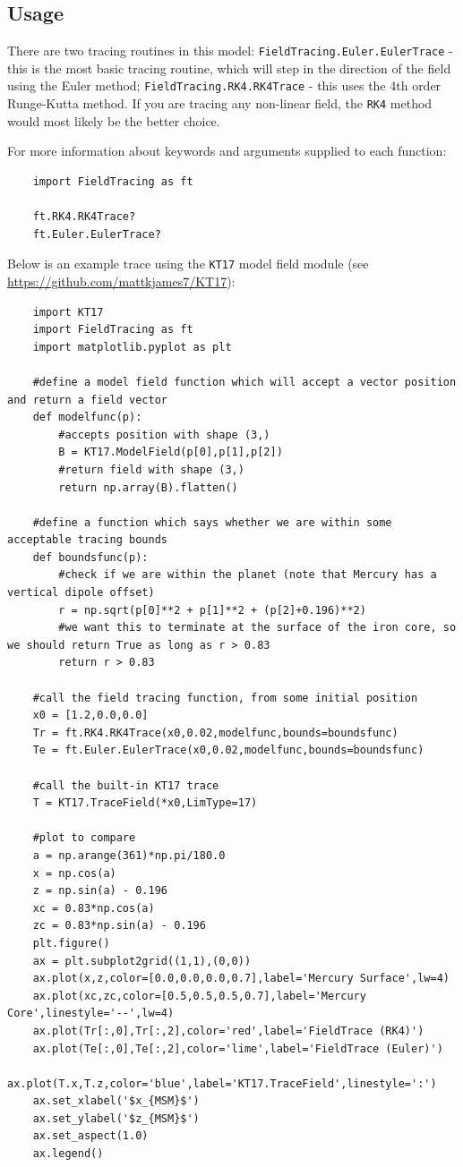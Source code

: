 	\subsection{Usage}
	
	There are two tracing routines in this model: \texttt{FieldTracing.Euler.EulerTrace} - this is the most basic tracing routine, which will step in the direction of the field using the Euler method; \texttt{FieldTracing.RK4.RK4Trace} - this uses the 4th order Runge-Kutta method. If you are tracing any non-linear field, the \texttt{RK4} method would most likely be the better choice.
	
	For more information about keywords and arguments supplied to each function:
	
	\begin{verbatim}
	import FieldTracing as ft
	
	ft.RK4.RK4Trace?
	ft.Euler.EulerTrace?
	\end{verbatim}
	
	Below is an example trace using the \texttt{KT17} model field module (see \url{https://github.com/mattkjames7/KT17}):
	
	\begin{verbatim}
	import KT17
	import FieldTracing as ft
	import matplotlib.pyplot as plt
	
	#define a model field function which will accept a vector position and return a field vector
	def modelfunc(p):
		#accepts position with shape (3,)
		B = KT17.ModelField(p[0],p[1],p[2])
		#return field with shape (3,)
		return np.array(B).flatten()
	
	#define a function which says whether we are within some acceptable tracing bounds
	def boundsfunc(p):
		#check if we are within the planet (note that Mercury has a vertical dipole offset)
		r = np.sqrt(p[0]**2 + p[1]**2 + (p[2]+0.196)**2)
		#we want this to terminate at the surface of the iron core, so we should return True as long as r > 0.83
		return r > 0.83
	
	#call the field tracing function, from some initial position
	x0 = [1.2,0.0,0.0]
	Tr = ft.RK4.RK4Trace(x0,0.02,modelfunc,bounds=boundsfunc)
	Te = ft.Euler.EulerTrace(x0,0.02,modelfunc,bounds=boundsfunc)
	
	#call the built-in KT17 trace
	T = KT17.TraceField(*x0,LimType=17)
	
	#plot to compare
	a = np.arange(361)*np.pi/180.0
	x = np.cos(a)
	z = np.sin(a) - 0.196
	xc = 0.83*np.cos(a)
	zc = 0.83*np.sin(a) - 0.196
	plt.figure()
	ax = plt.subplot2grid((1,1),(0,0))
	ax.plot(x,z,color=[0.0,0.0,0.0,0.7],label='Mercury Surface',lw=4)
	ax.plot(xc,zc,color=[0.5,0.5,0.5,0.7],label='Mercury Core',linestyle='--',lw=4)
	ax.plot(Tr[:,0],Tr[:,2],color='red',label='FieldTrace (RK4)')
	ax.plot(Te[:,0],Te[:,2],color='lime',label='FieldTrace (Euler)')
	ax.plot(T.x,T.z,color='blue',label='KT17.TraceField',linestyle=':')
	ax.set_xlabel('$x_{MSM}$')
	ax.set_ylabel('$z_{MSM}$')
	ax.set_aspect(1.0)
	ax.legend()
	\end{verbatim}
	
